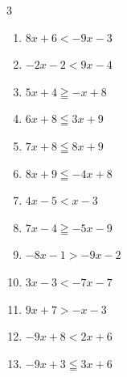 \begin{multicols}{3}
\begin{enumerate}

  \item $8x+6<-9x-3$


\columnbreak %

  \item $-2x-2<9x-4$


  \item $5x+4\geqq -x+8$


  \item $6x+8\leqq 3x+9$


  \item $7x+8\leqq 8x+9$

        \phantom{$\displaystyle x\geqq -1$}

  \item $8x+9\leqq -4x+8$


  \item $4x-5<x-3$


  \item $7x-4\geqq -5x-9$


  \item $-8x-1>-9x-2$

        \phantom{$\displaystyle x>-1$}

  \item $3x-3<-7x-7$


  \item $9x+7>-x-3$

        \phantom{$\displaystyle x>-1$}

  \item $-9x+8<2x+6$


  \item $-9x+3\leqq 3x+6$



\end{enumerate}
\end{multicols}
